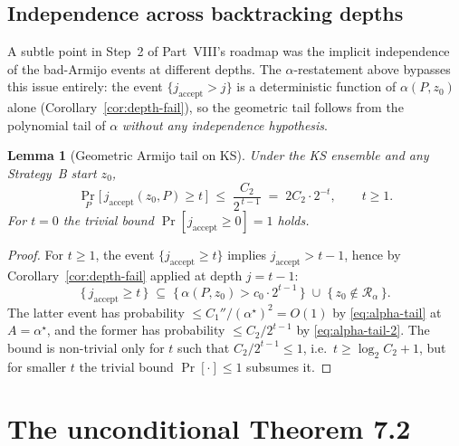 \documentclass[11pt,a4paper]{article}
\newtheorem{lemma}[theorem]{Lemma}
\begin{document}
\subsection{Independence across backtracking depths}

A subtle point in Step~2 of Part~VIII's roadmap was the implicit independence of the bad-Armijo events at different depths. The $\alpha$-restatement above bypasses this issue entirely: the event $\{j_{\text{accept}} > j\}$ is a deterministic function of $\alpha(P, z_0)$ alone (Corollary~\ref{cor:depth-fail}), so the geometric tail follows from the polynomial tail of $\alpha$ \emph{without any independence hypothesis}.

\begin{lemma}[Geometric Armijo tail on KS]\label{lem:geom-armijo}
Under the KS ensemble and any Strategy~B start $z_0$,
\begin{equation}\label{eq:geom-armijo}
\Pr_{P}\bigl[\, j_{\text{accept}}(z_0, P) \ge t \,\bigr] \;\le\; \frac{C_2}{2^{\,t-1}} \;=\; 2 C_2 \cdot 2^{-t}, \qquad t \ge 1.
\end{equation}
For $t = 0$ the trivial bound $\Pr[j_{\text{accept}} \ge 0] = 1$ holds.
\end{lemma}

\begin{proof}
For $t \ge 1$, the event $\{j_{\text{accept}} \ge t\}$ implies $j_{\text{accept}} > t - 1$, hence by Corollary~\ref{cor:depth-fail} applied at depth $j = t - 1$:
$$
\{\,j_{\text{accept}} \ge t\,\} \;\subseteq\; \{\,\alpha(P, z_0) > c_0 \cdot 2^{t-1}\,\}\;\cup\;\{\,z_0 \notin \mathcal{R}_\alpha\,\}.
$$
The latter event has probability $\le C_1''/(\alpha^\star)^2 = O(1)$ by \eqref{eq:alpha-tail} at $A = \alpha^\star$, and the former has probability $\le C_2/2^{t-1}$ by \eqref{eq:alpha-tail-2}. The bound is non-trivial only for $t$ such that $C_2/2^{t-1} \le 1$, i.e.\ $t \ge \log_2 C_2 + 1$, but for smaller $t$ the trivial bound $\Pr[\cdot] \le 1$ subsumes it.
\end{proof}

\section{The unconditional Theorem 7.2}\label{sec:unconditional}
\end{document}
